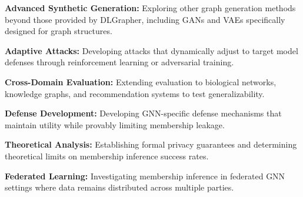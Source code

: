 \documentclass{article}
\begin{document}
\textbf{Advanced Synthetic Generation:} Exploring other graph generation methods beyond those provided by DLGrapher, including GANs and VAEs specifically designed for graph structures.

\textbf{Adaptive Attacks:} Developing attacks that dynamically adjust to target model defenses through reinforcement learning or adversarial training.

\textbf{Cross-Domain Evaluation:} Extending evaluation to biological networks, knowledge graphs, and recommendation systems to test generalizability.

\textbf{Defense Development:} Developing GNN-specific defense mechanisms that maintain utility while provably limiting membership leakage.

\textbf{Theoretical Analysis:} Establishing formal privacy guarantees and determining theoretical limits on membership inference success rates.

\textbf{Federated Learning:} Investigating membership inference in federated GNN settings where data remains distributed across multiple parties.





\end{document}
